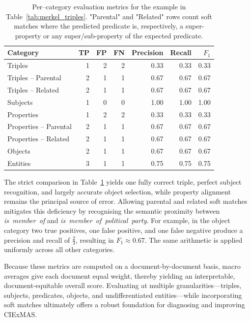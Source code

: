 \documentclass[a4paper,oneside,bibliography=totoc]{scrbook}
\begin{document}
\begin{table}[ht]
  \centering
  \label{tab:merkel_metrics}
  \begin{tabular}{lrrrrrr}
    \toprule
    Category               & TP & FP & FN & Precision & Recall & $F_1$ \\ \midrule
    Triples                & 1  & 2  & 2  & 0.33      & 0.33   & 0.33  \\
    Triples -- Parental    & 2  & 1  & 1  & 0.67      & 0.67   & 0.67  \\
    Triples -- Related     & 2  & 1  & 1  & 0.67      & 0.67   & 0.67  \\
    Subjects               & 1  & 0  & 0  & 1.00      & 1.00   & 1.00  \\
    Properties             & 1  & 2  & 2  & 0.33      & 0.33   & 0.33  \\
    Properties -- Parental & 2  & 1  & 1  & 0.67      & 0.67   & 0.67  \\
    Properties -- Related  & 2  & 1  & 1  & 0.67      & 0.67   & 0.67  \\
    Objects                & 2  & 1  & 1  & 0.67      & 0.67   & 0.67  \\
    Entities               & 3  & 1  & 1  & 0.75      & 0.75   & 0.75  \\
    \bottomrule
  \end{tabular}
  \caption{Per--category evaluation metrics for the example in Table~\ref{tab:merkel_triples}.  "Parental" and "Related" rows count soft matches where the predicted predicate is, respectively, a super-property or any super/sub-property of the expected predicate.}
\end{table}

The strict comparison in Table~\ref{tab:merkel_metrics} yields one fully correct triple, perfect subject recognition, and largely accurate object selection, while property alignment remains the principal source of error.  Allowing parental and related soft matches mitigates this deficiency by recognising the semantic proximity between \textit{is~member~of} and \textit{is~member~of~political~party}.  For example, in the object category two true positives, one false positive, and one false negative produce a precision and recall of $\tfrac{2}{3}$, resulting in $F_1\approx0.67$.  The same arithmetic is applied uniformly across all other categories.

Because these metrics are computed on a document-by-document basis, macro averages give each document equal weight, thereby yielding an interpretable, document-equitable overall score.  Evaluating at multiple granularities—triples, subjects, predicates, objects, and undifferentiated entities—while incorporating soft matches ultimately offers a robust foundation for diagnosing and improving CIExMAS.
\end{document}

